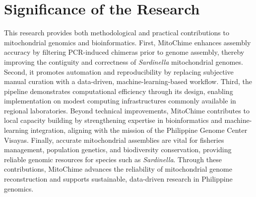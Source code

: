 \section{Significance of the Research}\label{sec:significance}

This research provides both methodological and practical contributions to mitochondrial genomics and bioinformatics. First, MitoChime enhances assembly accuracy by filtering PCR-induced chimeras prior to genome assembly, thereby improving the contiguity and correctness of \textit{Sardinella} mitochondrial genomes. Second, it promotes automation and reproducibility by replacing subjective manual curation with a data-driven, machine-learning-based workflow. Third, the pipeline demonstrates computational efficiency through its design, enabling implementation on modest computing infrastructures commonly available in regional laboratories. Beyond technical improvements, MitoChime contributes to local capacity building by strengthening expertise in bioinformatics and machine-learning integration, aligning with the mission of the Philippine Genome Center Visayas. Finally, accurate mitochondrial assemblies are vital for fisheries management, population genetics, and biodiversity conservation, providing reliable genomic resources for species such as \textit{Sardinella}. Through these contributions, MitoChime advances the reliability of mitochondrial genome reconstruction and supports sustainable, data-driven research in Philippine genomics.